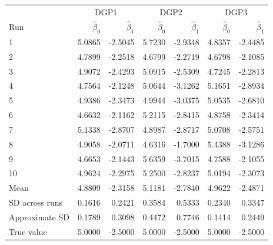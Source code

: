 \begin{tabular}{lrrrrrr}
\toprule
 & \multicolumn{2}{c}{DGP1} & \multicolumn{2}{c}{DGP2} & \multicolumn{2}{c}{DGP3} \\
Run & $\hat\beta_0$ & $\hat\beta_1$ & $\hat\beta_0$ & $\hat\beta_1$ & $\hat\beta_0$ & $\hat\beta_1$ \\
\midrule
1 & 5.0865 & -2.5045 & 5.7230 & -2.9348 & 4.8357 & -2.4485 \\
2 & 4.7899 & -2.2518 & 4.6799 & -2.2719 & 4.6798 & -2.1085 \\
3 & 4.9072 & -2.4293 & 5.0915 & -2.5309 & 4.7245 & -2.2813 \\
4 & 4.7564 & -2.1248 & 5.0644 & -3.1262 & 5.1651 & -2.8934 \\
5 & 4.9386 & -2.3473 & 4.9944 & -3.0375 & 5.0535 & -2.6810 \\
6 & 4.6632 & -2.1162 & 5.2115 & -2.8415 & 4.8758 & -2.3414 \\
7 & 5.1338 & -2.8707 & 4.8987 & -2.8717 & 5.0708 & -2.5751 \\
8 & 4.9058 & -2.0711 & 4.6316 & -1.7000 & 5.4388 & -3.1286 \\
9 & 4.6653 & -2.1443 & 5.6359 & -3.7015 & 4.7588 & -2.1055 \\
10 & 4.9624 & -2.2975 & 5.2500 & -2.8237 & 5.0194 & -2.3073 \\
\midrule
Mean & 4.8809 & -2.3158 & 5.1181 & -2.7840 & 4.9622 & -2.4871 \\
SD across runs & 0.1616 & 0.2421 & 0.3584 & 0.5333 & 0.2340 & 0.3347 \\
Approximate SD & 0.1789 & 0.3098 & 0.4472 & 0.7746 & 0.1414 & 0.2449 \\
\midrule
True value & 5.0000 & -2.5000 & 5.0000 & -2.5000 & 5.0000 & -2.5000 \\
\bottomrule
\end{tabular}
